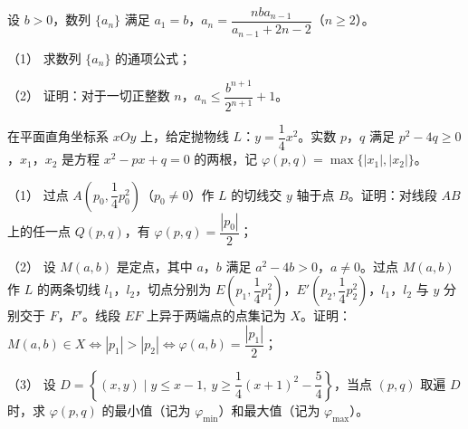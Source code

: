 \begin{question}
设 $b>0$，数列 $\{a_n\}$ 满足 $a_1=b$，$a_n=\dfrac{nba_{n-1}}{a_{n-1}+2n-2}$（$n\geqslant2$）。

（1） 求数列 $\{a_n\}$ 的通项公式；

（2） 证明：对于一切正整数 $n$，$a_n\leqslant\dfrac{b^{n+1}}{2^{n+1}}+1$。

\end{question}
\begin{question}
在平面直角坐标系 $xOy$ 上，给定抛物线 $L$：$y=\dfrac14x^2$。实数 $p$，$q$ 满足 $p^2-4q\geqslant0$，$x_1$，$x_2$ 是方程 $x^2-px+q=0$ 的两根，记 $\varphi(p,q)=\max\{|x_1|,|x_2|\}$。

（1） 过点 $A\left(p_0,\dfrac14p_0^2\right)$（$p_0\neq0$）作 $L$ 的切线交 $y$ 轴于点 $B$。证明：对线段 $AB$ 上的任一点 $Q(p,q)$，有 $\varphi(p,q)=\dfrac{|p_0|}{2}$；

（2） 设 $M(a,b)$ 是定点，其中 $a$，$b$ 满足 $a^2-4b>0$，$a\neq0$。过点 $M(a,b)$ 作 $L$ 的两条切线 $l_1$，$l_2$，切点分别为 $E\left(p_1,\dfrac14p_1^2\right)$，$E'\left(p_2,\dfrac14p_2^2\right)$，$l_1$，$l_2$ 与 $y$ 分别交于 $F$，$F'$。线段 $EF$ 上异于两端点的点集记为 $X$。证明：$M(a,b)\in X\Leftrightarrow|p_1|>|p_2|\Leftrightarrow\varphi(a,b)=\dfrac{|p_1|}{2}$；

（3） 设 $D=\left\{(x,y)\mid y\leqslant x-1,\ y\geqslant\dfrac14(x+1)^2-\dfrac54\right\}$，当点 $(p,q)$ 取遍 $D$ 时，求 $\varphi(p,q)$ 的最小值（记为 $\varphi_{\min}$）和最大值（记为 $\varphi_{\max}$）。

\end{question}